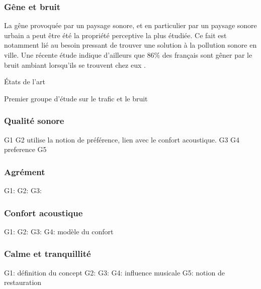 \subsubsection{Gêne et bruit}

La gêne provoquée par un paysage sonore, et en particulier par un paysage sonore urbain a peut être été la propriété perceptive la plus étudiée. Ce fait est notamment lié au besoin pressant de trouver une solution à la pollution sonore en ville. Une récente étude indique d'ailleurs que 86\% des français sont gêner par le bruit ambiant lorsqu'ils se trouvent chez eux \citep{noiseFrench}.

États de l'art \citep{marquis2005noisea,marquis2005noiseb}

Premier groupe d'étude sur le trafic et le bruit \citep{gille2016testing,gille2016noise,gille2016dose,morel2016noise,trolle2015perception,marquis2015simulated,klein2015spectral,}

\subsubsection{Qualité sonore}

G1 \citep{brocolini2012prediction,ricciardi2015sound}
G2 \citep{hong2013designing} utilise la notion de préférence, lien avec le confort acoustique.
G3 \citep{ozcevik2012laboratory}
G4 \citep{yu2010factors} preference
G5 \citep{nilsson2006soundscape,nilsson2007acoustic}

\subsubsection{Agrément}

G1: \citep{garcia2012validation} 
G2: \citep{lavandier2006contribution}
G3: \citep{guillen2007importance}

\subsubsection{Confort acoustique}

G1: \citep{yang2005acoustic,meng2013field}
G2: \citep{jeon2011non,jeon2013soundwalk}
G3: \citep{tse2012perception}
G4: \citep{yu2009modeling} modèle du confort

\subsubsection{Calme et tranquillité}

G1: \citep{delaitre2012definition} définition du concept
G2: \citep{pheasant2008acoustic,pheasant2009validation}
G3: \citep{memoli2008soundscape}
G4: \citep{de2006quiet,de2013characterizing} influence musicale
G5: \citep{payne2013production} notion de restauration


